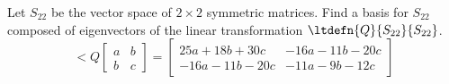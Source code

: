 Let $S_{22}$ be the vector space of $2\times 2$ symmetric matrices.  Find a basis for $S_{22}$ composed of eigenvectors of the linear transformation $\ltdefn{Q}{S_{22}}{S_{22}}$.
%
\begin{equation*}
\lt{Q}{
\begin{bmatrix}
 a  &  b\\
 b  &  c
\end{bmatrix}
}
=
\begin{bmatrix}
 25a + 18b + 30c  &  -16a - 11b - 20c\\
 -16a - 11b - 20c  &  -11a - 9b - 12c
\end{bmatrix}
\end{equation*}